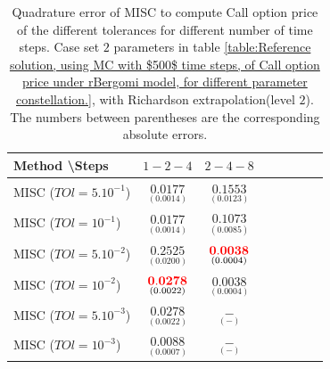 \documentclass[11pt]{article}
\begin{document}
		
		
	
		
		
		
		
		\begin{table}[!h]
			\centering
			\begin{tabular}{l*{6}{c}r}
				Method \textbackslash  Steps            & $1-2-4$ & $2-4-8$  \\
				\hline
				MISC ($TOl=5.10^{-1}$)  & $\underset{(    0.0014)}{\mathbf{  0.0177}}$ & $\underset{(0.0123)}{\mathbf{0.1553}}$ \\
				MISC ($TOl=10^{-1}$)  & $\underset{(    0.0014)}{\mathbf{  0.0177}}$ & $\underset{(  0.0085)}{\mathbf{0.1073}}$  \\
				MISC ($TOl=5.10^{-2}$)  & $\underset{(  0.0200)}{\mathbf{  0.2525}}$ & $\underset{(0.0004)}{\mathbf{{\color{red}0.0038}}}$   \\
				MISC ($TOl=10^{-2}$)  & $\underset{(0.0022)}{\mathbf{{\color{red}0.0278}}}$ &     $\underset{(0.0004)}{\mathbf{0.0038}}$  \\
				
				MISC ($TOl=5.10^{-3}$)  & $\underset{(0.0022)}{\mathbf{0.0278}}$&    $\underset{(-
					)}{\mathbf{-}}$ \\
				MISC ($TOl=10^{-3}$)  & $\underset{(0.0007
					)}{\mathbf{
						0.0088}}$ &    $\underset{(-
					)}{\mathbf{ -}}$ \\
				
	
				\hline
			\end{tabular}
			\caption{Quadrature error of MISC to compute Call option price of the different tolerances for different number of time steps. Case set $2$ parameters in table \ref{table:Reference solution, using MC with $500$ time steps, of Call option price under rBergomi model, for different parameter constellation.}, with Richardson extrapolation(level $2$). The numbers between parentheses are the corresponding absolute errors.}
			\label{Quadrature error of MISC to compute Call option price of the different tolerances for different number of time steps. Case set $2$ parameters, with Richardson extrapolation(level $2$). The numbers between parentheses are the corresponding absolute errors,linear}
		\end{table}
	
\end{document}
